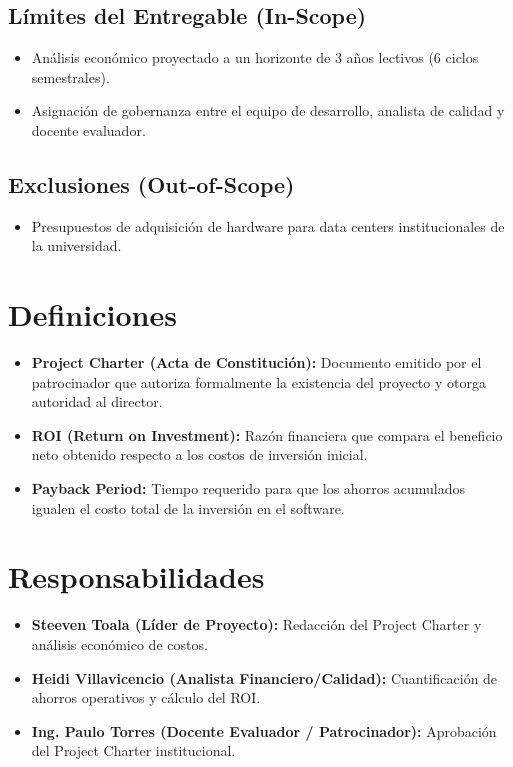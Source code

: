 \documentclass[12pt,a4paper]{article}
\begin{document}
\subsection{Límites del Entregable (In-Scope)}
\begin{itemize}[leftmargin=1.5em, itemsep=2pt]
    \item Análisis económico proyectado a un horizonte de 3 años lectivos (6 ciclos semestrales).
    \item Asignación de gobernanza entre el equipo de desarrollo, analista de calidad y docente evaluador.
\end{itemize}
\subsection{Exclusiones (Out-of-Scope)}
\begin{itemize}[leftmargin=1.5em, itemsep=2pt]
    \item Presupuestos de adquisición de hardware para data centers institucionales de la universidad.
\end{itemize}

\section{Definiciones}
\begin{itemize}[leftmargin=1.5em, itemsep=2pt]
    \item \textbf{Project Charter (Acta de Constitución):} Documento emitido por el patrocinador que autoriza formalmente la existencia del proyecto y otorga autoridad al director.
    \item \textbf{ROI (Return on Investment):} Razón financiera que compara el beneficio neto obtenido respecto a los costos de inversión inicial.
    \item \textbf{Payback Period:} Tiempo requerido para que los ahorros acumulados igualen el costo total de la inversión en el software.
\end{itemize}

\section{Responsabilidades}
\begin{itemize}[leftmargin=1.5em, itemsep=2pt]
    \item \textbf{Steeven Toala (Líder de Proyecto):} Redacción del Project Charter y análisis económico de costos.
    \item \textbf{Heidi Villavicencio (Analista Financiero/Calidad):} Cuantificación de ahorros operativos y cálculo del ROI.
    \item \textbf{Ing. Paulo Torres (Docente Evaluador / Patrocinador):} Aprobación del Project Charter institucional.
\end{itemize}
\end{document}
